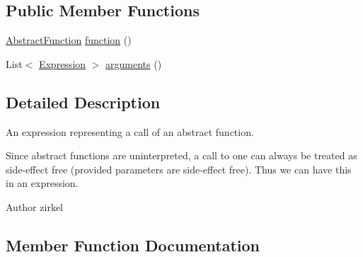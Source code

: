 \subsection*{Public Member Functions}
\begin{DoxyCompactItemize}
\item 
\hyperlink{interfaceedu_1_1udel_1_1cis_1_1vsl_1_1civl_1_1model_1_1IF_1_1AbstractFunction}{Abstract\+Function} \hyperlink{interfaceedu_1_1udel_1_1cis_1_1vsl_1_1civl_1_1model_1_1IF_1_1expression_1_1AbstractFunctionCallExpression_a41484496b522e88da2db206c9d635455}{function} ()
\item 
List$<$ \hyperlink{interfaceedu_1_1udel_1_1cis_1_1vsl_1_1civl_1_1model_1_1IF_1_1expression_1_1Expression}{Expression} $>$ \hyperlink{interfaceedu_1_1udel_1_1cis_1_1vsl_1_1civl_1_1model_1_1IF_1_1expression_1_1AbstractFunctionCallExpression_ad4b6af4d4a9d290a7e2dc0281188fcd0}{arguments} ()
\end{DoxyCompactItemize}


\subsection{Detailed Description}
An expression representing a call of an abstract function. 

Since abstract functions are uninterpreted, a call to one can always be treated as side-\/effect free (provided parameters are side-\/effect free). Thus we can have this in an expression.

\begin{DoxyAuthor}{Author}
zirkel 
\end{DoxyAuthor}


\subsection{Member Function Documentation}
\hypertarget{interfaceedu_1_1udel_1_1cis_1_1vsl_1_1civl_1_1model_1_1IF_1_1expression_1_1AbstractFunctionCallExpression_ad4b6af4d4a9d290a7e2dc0281188fcd0}{}
